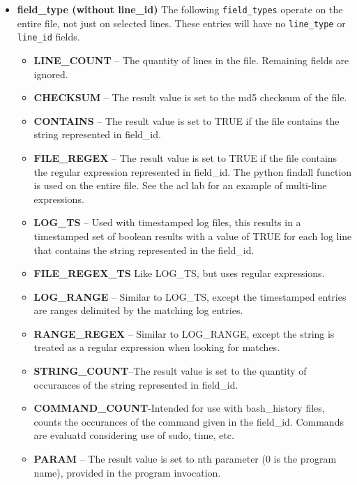 \documentclass[12pt]{article}
\begin{document}
\begin{itemize}
\item \textbf{field\_type (without line\_id)} The following {\tt field\_types} operate on the entire file, not just on selected lines.  These entries will have
no {\tt line\_type} or {\tt line\_id} fields.
\begin{itemize}
\item \textbf{LINE\_COUNT} -- The quantity of lines in the file. Remaining fields 
                             are ignored.
\item \textbf{CHECKSUM}   -- The result value is set to the md5 checksum 
                             of the file.
\item \textbf{CONTAINS}   -- The result value is set to TRUE if the file 
                             contains the string represented in field\_id.
\item \textbf{FILE\_REGEX} -- The result value is set to TRUE if the file 
                             contains the regular expression represented in field\_id.
                             The python findall function is used on the entire file.
                             See the acl lab for an example of multi-line expressions.
\item \textbf{LOG\_TS}     -- Used with timestamped log files, this results in a 
                             timestamped set of boolean results with a value
                             of TRUE for each log line that contains the string 
                             represented in the field\_id.
\item \textbf{FILE\_REGEX\_TS} Like LOG\_TS, but uses regular expressions.
\item \textbf{LOG\_RANGE}  -- Similar to LOG\_TS, except the timestamped entries
                             are ranges delimited by the matching log entries.
\item \textbf{RANGE\_REGEX}  -- Similar to LOG\_RANGE, except the string is treated
                             as a regular expression when looking for matches.
\item \textbf{STRING\_COUNT}--The result value is set to the quantity of
                             occurances of the string represented in field\_id.
\item \textbf{COMMAND\_COUNT}-Intended for use with bash\_history files, counts
                             the occurances of the command given in the field\_id.
                             Commands are evaluatd considering use of sudo, time, etc.
\item \textbf{PARAM}      -- The result value is set to nth parameter
                             (0 is the program name), provided in the 
                             program invocation.  
                             

\end{itemize}
\end{itemize}
\end{document}
